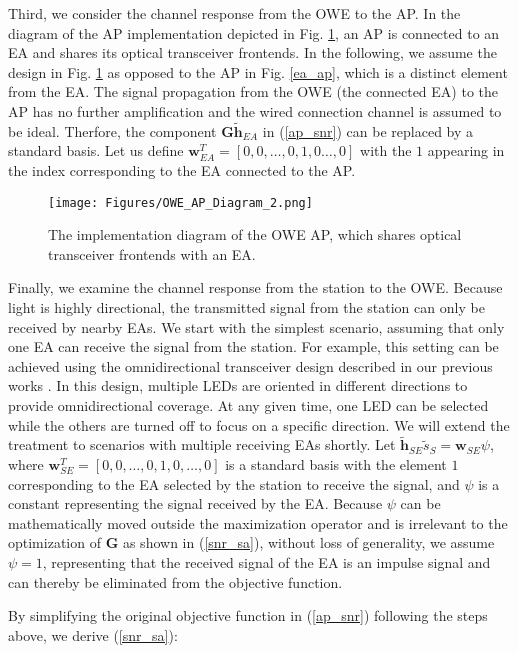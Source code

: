 \par
Third, we consider the channel response from the OWE to the AP. In the diagram of the AP implementation depicted in Fig. \ref{OWE_AP}, an AP is connected to an EA and shares its optical transceiver frontends. In the following, we assume the design in Fig. \ref{OWE_AP} as opposed to the AP in Fig. \ref{ea_ap}, which is a distinct element from the EA. The signal propagation from the OWE (the connected EA) to the AP has no further amplification and the wired connection channel is assumed to be ideal. Therfore, the component $\mathbf{G}{{\mathbf{\tilde h}}_{EA}}$ in (\ref{ap_snr}) can be replaced by a standard basis. Let us define $\mathbf{w}_{EA}^T=[0,0,\dots,0, 1, 0\dots, 0]$ with the $1$ appearing in the index corresponding to the EA connected to the AP.
\begin{figure}
\centering
\texttt{[image: Figures/OWE\_AP\_Diagram\_2.png]}
\caption{The implementation diagram of the OWE AP, which shares optical transceiver frontends with an EA.}
\label{OWE_AP}
\vspace{-0.5cm}
\end{figure}
\par
Finally, we examine the channel response from the station to the OWE. Because light is highly directional, the transmitted signal from the station can only be received by nearby EAs. We start with the simplest scenario, assuming that only one EA can receive the signal from the station. 
For example, this setting can be achieved using the omnidirectional transceiver design described in our previous works \cite{cui2024wi, cui202412}. In this design, multiple LEDs are oriented in different directions to provide omnidirectional coverage. At any given time, one LED can be selected while the others are turned off to focus on a specific direction.
We will extend the treatment to scenarios with multiple receiving EAs shortly.
Let ${{\mathbf{\tilde h}}_{SE}}{{\tilde s}_{S}} = \mathbf{w}_{SE} \psi$, where $\mathbf{w}_{SE}^T=[0,0,\dots,0, 1, 0,\dots, 0]$ is a standard basis with the element $1$ corresponding to the EA selected by the station to receive the signal, and $\psi$ is a constant representing the signal received by the EA. Because $\psi$ can be mathematically moved outside the maximization operator and is irrelevant to the optimization of $\mathbf{G}$ as shown in (\ref{snr_sa}), without loss of generality, we assume $\psi=1$, representing that the received signal of the EA is an impulse signal and can thereby be eliminated from the objective function.
\par
By simplifying the original objective function in (\ref{ap_snr}) following the steps above, we derive (\ref{snr_sa}):

